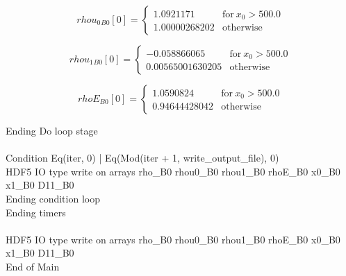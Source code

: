 \documentclass{article}
\begin{document}
\begin{dmath}{rhou_{0}{_{B0}}}[{0}] = \begin{cases} 1.0921171 & \text{for}\: x_{0} > 500.0 \\1.00000268202 & \text{otherwise} \end{cases}\end{dmath}

\begin{dmath}{rhou_{1}{_{B0}}}[{0}] = \begin{cases} -0.058866065 & \text{for}\: x_{0} > 500.0 \\0.00565001630205 & \text{otherwise} \end{cases}\end{dmath}

\begin{dmath}{rhoE{_{B0}}}[{0}] = \begin{cases} 1.0590824 & \text{for}\: x_{0} > 500.0 \\0.94644428042 & \text{otherwise} \end{cases}\end{dmath}

\noindent Ending Do loop stage\\
\\\noindent Condition Eq(iter, 0) | Eq(Mod(iter + 1, write_output_file), 0)\\\noindent HDF5 IO type write on arrays rho_B0 rhou0_B0 rhou1_B0 rhoE_B0 x0_B0 x1_B0 D11_B0\\\noindent Ending condition loop %
\\\noindent Ending timers\\
\\\noindent HDF5 IO type write on arrays rho_B0 rhou0_B0 rhou1_B0 rhoE_B0 x0_B0 x1_B0 D11_B0\\\noindent End of Main\\
\end{document}
